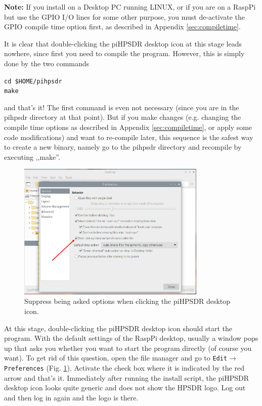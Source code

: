 \documentclass[12pt]{book}
\def\grtt#1{\texttt{\color{magenta}#1}}
\def\pH{pi\-HPSDR\xspace}
\begin{document}
\textbf{Note:} If you install on a Desktop PC running LINUX, or if you are on a RaspPi but use
the GPIO I/O lines for some other purpose, you must de-activate the GPIO compile time option
first, as described in Appendix \ref{sec:compiletime}.

It is clear that double-clicking the \pH desktop icon at this stage leads nowhere,
since first you need to compile the program.
However,
this is simply done by the two commands

\grtt{cd \$HOME/pihpsdr} \\
\grtt{make}

and that's it! The first command is even not necessary (since you are in the pihpsdr
directory at that point).
But if you make changes (e.g. changing the compile time options as described in
Appendix \ref{sec:compiletime}, or apply some code modifications)
and want to re-compile later, this sequence is the safest way to create a new binary,
namely go to the pihpsdr
directory and recompile by executing ,,make''.

\begin{figure}[ht]
\center
\includegraphics[width=9cm]{piDontAsk.png}
\caption{Suppress being asked options when clicking the \pH desktop icon.}
\label{fig:piDontAsk}
\end{figure}

At this stage, double-clicking the \pH desktop icon should start the program.
With the default settings of the RaspPi desktop, usually a window pops up that
asks you whether you want to start the program directly (of course you want).
To get rid of this question, open the file manager
and go to
\texttt{Edit}$\to$\texttt{Preferences} (Fig. \ref{fig:piDontAsk}). Activate the check
box where it is indicated by the red arrow and that's it.
Immediately after running the install script, the \pH desktop icon
looks quite generic and does not show the HPSDR logo. Log out and then log in again
and the logo is there.
\end{document}
